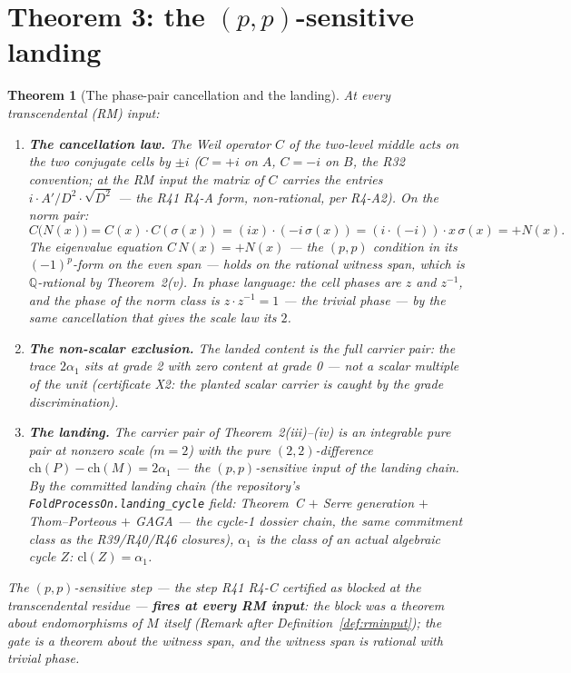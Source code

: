 \documentclass[11pt]{article}
\newtheorem{theorem}{Theorem}
\theoremstyle{definition}
\begin{document}
\section{Theorem 3: the $(p,p)$-sensitive landing}

\begin{theorem}[The phase-pair cancellation and the landing]\label{thm:landing}
At every transcendental (RM) input:
\begin{enumerate}[label=(\roman*)]
\item \textbf{The cancellation law.} The Weil operator $C$ of the
two-level middle acts on the two conjugate cells by $\pm i$ ($C=+i$ on
$A$, $C=-i$ on $B$, the R32 convention; at the RM input the matrix of
$C$ carries the entries $i\cdot A'/D^2\cdot\sqrt{D^2}$ --- the R41 R4-A
form, non-rational, per R4-A2). On the norm pair:
\[
C\bigl(N(x)\bigr)
= C(x)\cdot C(\sigma(x))
= (ix)\cdot(-i\,\sigma(x))
= (i\cdot(-i))\cdot x\,\sigma(x)
= +N(x).
\]
The eigenvalue equation $C\,N(x)=+N(x)$ --- the $(p,p)$ condition in
its $(−1)^p$-form on the even span --- holds \emph{on the rational
witness span}, which is $\mathbb{Q}$-rational by Theorem~2(v). In phase
language: the cell phases are $z$ and $z^{-1}$, and the phase of the
norm class is $z\cdot z^{-1}=1$ --- the trivial phase --- \emph{by the
same cancellation that gives the scale law its $2$}.
\item \textbf{The non-scalar exclusion.} The landed content is the full
carrier pair: the trace $2\alpha_1$ sits at grade 2 with zero content at
grade 0 --- not a scalar multiple of the unit (certificate X2: the
planted scalar carrier is caught by the grade discrimination).
\item \textbf{The landing.} The carrier pair of Theorem~2(iii)--(iv) is
an integrable pure pair at nonzero scale ($m=2$) with the pure
$(2,2)$-difference $\mathrm{ch}(P)-\mathrm{ch}(M)=2\alpha_1$ --- the
$(p,p)$-sensitive input of the landing chain. By the committed landing
chain (the repository's \texttt{FoldProcessOn.landing\_cycle} field:
Theorem~C $+$ Serre generation $+$ Thom--Porteous $+$ GAGA --- the
cycle-1 dossier chain, the same commitment class as the R39/R40/R46
closures), $\alpha_1$ is the class of an actual algebraic cycle $Z$:
$\mathrm{cl}(Z)=\alpha_1$.
\end{enumerate}
The $(p,p)$-sensitive step --- the step R41 R4-C certified as blocked at
the transcendental residue --- \textbf{fires at every RM input}: the
block was a theorem about endomorphisms of $M$ itself (Remark after
Definition~\ref{def:rminput}); the gate is a theorem about the witness
span, and the witness span is rational with trivial phase.
\end{theorem}
\end{document}
